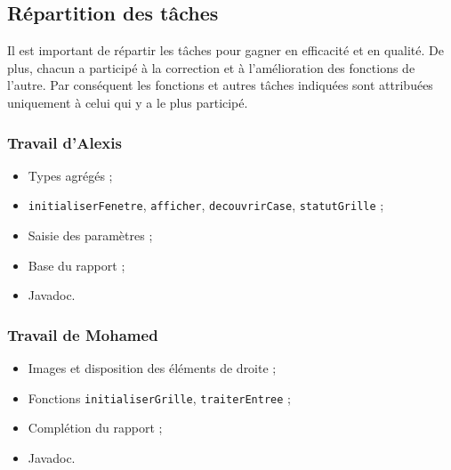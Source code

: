 \documentclass[a4paper, 12pt, oneside]{article}
\newcommand{\var}[1]{\texttt{#1}}
\begin{document}
\newpage
\subsection{Répartition des tâches}
Il est important de répartir les tâches pour gagner en efficacité et en qualité. De plus, chacun a participé à la correction et à l'amélioration des fonctions de l'autre. Par conséquent les fonctions et autres tâches indiquées sont attribuées uniquement à celui qui y a le plus participé.

\subsubsection{Travail d'Alexis}
\begin{itemize}
	\item Types agrégés ; 
	\item \var{initialiserFenetre}, \var{afficher}, \var{decouvrirCase}, \var{statutGrille} ;
	\item Saisie des paramètres ;
	\item Base du rapport ;
	\item Javadoc.
\end{itemize}

\subsubsection{Travail de Mohamed}
\begin{itemize}
	\item Images et disposition des éléments de droite ;
	\item Fonctions \var{initialiserGrille}, \var{traiterEntree} ;
	\item Complétion du rapport ;
	\item Javadoc.
\end{itemize}
\end{document}
